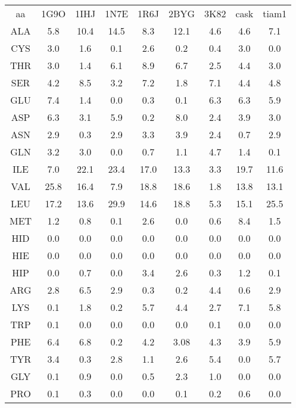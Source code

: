 \begin{enumarete}
\begin{table}[!htbp]
\begin{tabular}{ccccccccc}
        \toprule
        aa & 1G9O & 1IHJ & 1N7E & 1R6J & 2BYG & 3K82 & cask & tiam1 \\
        \cmidrule{1-9}
     ALA  & 5.8  & 10.4 & 14.5  & 8.3  &  12.1 &  4.6 &    4.6   &     7.1  \\
     CYS  & 3.0  & 1.6  & 0.1   & 2.6  &  0.2  &  0.4 &    3.0   &     0.0  \\
     THR  & 3.0  & 1.4  & 6.1   &  8.9  &  6.7  &  2.5 &    4.4   &     3.0  \\
        \cmidrule{1-9}
     SER  & 4.2  & 8.5  & 3.2   & 7.2  &  1.8  &  7.1 &    4.4   &     4.8  \\
        \cmidrule{1-9}
     GLU  & 7.4  & 1.4  & 0.0   & 0.3  &  0.1  &  6.3 &    6.3   &     5.9  \\
     ASP  & 6.3  & 3.1  & 5.9   & 0.2  &  8.0  &  2.4 &    3.9   &     3.0  \\
        \cmidrule{1-9}
     ASN  & 2.9   & 0.3  & 2.9  & 3.3  &  3.9  &  2.4 &    0.7   &     2.9  \\
     GLN  & 3.2  & 3.0  & 0.0   & 0.7  &  1.1  &  4.7 &    1.4   &     0.1  \\
        \cmidrule{1-9}
     ILE  & 7.0  & 22.1 & 23.4  & 17.0 &  13.3 &  3.3 &    19.7  &     11.6  \\
     VAL  & 25.8 & 16.4 & 7.9   & 18.8 &  18.6 &  1.8 &    13.8  &     13.1  \\
     LEU  & 17.2 & 13.6 & 29.9  & 14.6 &  18.8 &  5.3 &    15.1  &     25.5  \\
        \cmidrule{1-9}
     MET  & 1.2  & 0.8  & 0.1   & 2.6  &  0.0  &  0.6 &    8.4   &     1.5  \\
        \cmidrule{1-9}
     HID  & 0.0  & 0.0  & 0.0   & 0.0  &  0.0  &  0.0 &    0.0   &     0.0  \\
     HIE  & 0.0  & 0.0  & 0.0   & 0.0  &  0.0  &  0.0 &    0.0   &     0.0  \\
     HIP  & 0.0  & 0.7  & 0.0   & 3.4  &  2.6  &  0.3 &    1.2   &     0.1  \\
        \cmidrule{1-9}
     ARG  & 2.8  & 6.5  & 2.9   & 0.3  &  0.2  &  4.4 &    0.6   &     2.9  \\
        \cmidrule{1-9}
     LYS  & 0.1  & 1.8  & 0.2   & 5.7  &  4.4  &  2.7 &    7.1   &     5.8  \\
        \cmidrule{1-9}
     TRP  & 0.1 & 0.0  & 0.0    & 0.0  &  0.0  &  0.1 &    0.0   &     0.0  \\
        \cmidrule{1-9}
     PHE  & 6.4  & 6.8  & 0.2  & 4.2  &  3.08 &  4.3 &    3.9   &     5.9  \\
        \cmidrule{1-9}
     TYR  & 3.4  & 0.3  & 2.8  & 1.1  &  2.6  &  5.4 &    0.0   &     5.7  \\
        \cmidrule{1-9}
     GLY  & 0.1  & 0.9  & 0.0  & 0.5  &  2.3  &  1.0 &    0.0   &     0.0  \\
     PRO  & 0.1  & 0.3  & 0.0  & 0.0  &  0.1  &  0.2 &    0.6   &     0.0  \\


\end{tabular}
\end{table}
\end{enumarete}
